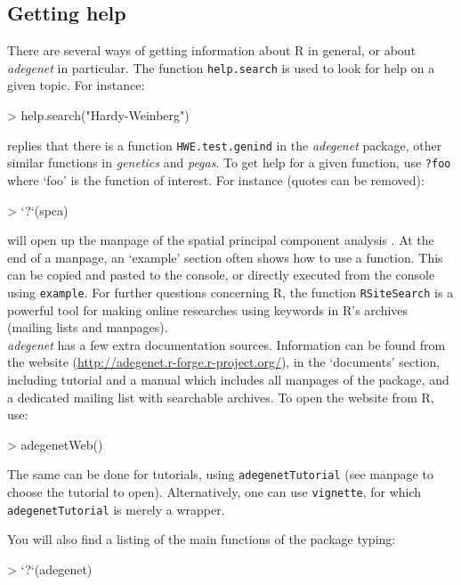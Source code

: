 \documentclass{article}
\begin{document}
\subsection{Getting help}
There are several ways of getting information about R in general, or about
\textit{adegenet} in particular.
The function \texttt{help.search} is used to look for help on a given topic.
For instance:
\begin{Schunk}
\begin{Sinput}
> help.search("Hardy-Weinberg")
\end{Sinput}
\end{Schunk}
replies that there is a function \texttt{HWE.test.genind} in the
\textit{adegenet} package, other similar functions in \textit{genetics} and \textit{pegas}.
To get help for a given function, use \texttt{?foo} where `foo' is the
function of interest.
For instance (quotes can be removed):
\begin{Schunk}
\begin{Sinput}
> `?`(spca)
\end{Sinput}
\end{Schunk}
will open up the manpage of the spatial principal component analysis \cite{tjart04}.
At the end of a manpage, an `example' section often shows how to use a function.
This can be copied and pasted to the console, or directly executed
from the console using \texttt{example}.
For further questions concerning R, the function \texttt{RSiteSearch}
is a powerful tool for making online researches using keywords in R's archives (mailing
lists and manpages).
\\


\textit{adegenet} has a few extra documentation sources.
Information can be found from the website
(\url{http://adegenet.r-forge.r-project.org/}), in the `documents'
section, including tutorial and a manual which includes all
manpages of the package, and a dedicated mailing list with searchable archives.
To open the website from R, use:
\begin{Schunk}
\begin{Sinput}
> adegenetWeb()
\end{Sinput}
\end{Schunk}
The same can be done for tutorials, using \texttt{adegenetTutorial} (see
manpage to choose the tutorial to open).
Alternatively, one can use \texttt{vignette}, for which \texttt{adegenetTutorial} is merely a wrapper.

You will also find a listing of the main functions of the package typing:
\begin{Schunk}
\begin{Sinput}
> `?`(adegenet)
\end{Sinput}
\end{Schunk}
\end{document}

